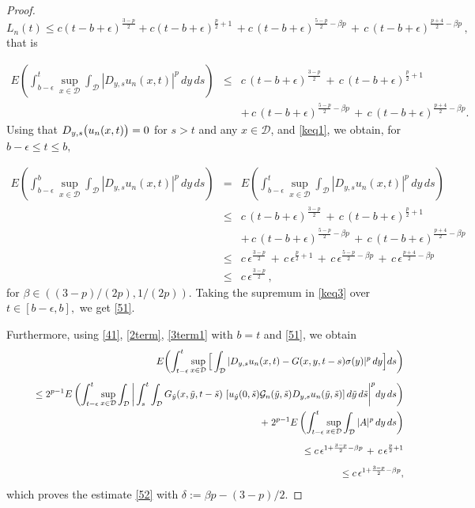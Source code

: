 \documentclass[10pt,a4paper]{amsart}
\newcommand{\cd}{\mathcal{D}}
\newcommand{\cg}{\mathcal{G}}
\begin{document}
\begin{proof}
$$L_n(t) \leq c (t-b+\epsilon)^{\frac{3-p}{2}} + c (t-b+\epsilon)^{\frac{p}{2}+1}\,+ c\, (t-b+\epsilon)^{\frac{5-p}{2}-\beta p}
\,+\,
c \, (t-b+\epsilon)^{\frac{p+4}{2}-\beta p} \,,$$
that is

\begin{eqnarray}\label{keq1}
E\left(\int_{b-\epsilon}^t \sup\limits_{x\in\mathcal{D}} \int_{\mathcal{D}}|D_{y,s}u_{n}(x,t)|^p\,dy\, ds\right)
&\leq& c \,(t-b+\epsilon)^{\frac{3-p}{2}} \,+\, c\, (t-b+\epsilon)^{\frac{p}{2}+1}
\nonumber\\
& & + \,c \,(t-b+\epsilon)^{\frac{5-p}{2}-\beta p}\,+\,
c \, (t-b+\epsilon)^{\frac{p+4}{2}-\beta p}.
\end{eqnarray}
Using that $ D_{y,s}\bigl{(}u_n(x,t)\bigr{)}=0 $ for $s>t$ and any $x\in\cd$, and \eqref{keq1}, we obtain, for $ b-\epsilon\leq t\leq b,$

\begin{eqnarray}\label{keq2}
E\left(\int_{b-\epsilon}^b \sup\limits_{x\in\mathcal{D}} \int_{\mathcal{D}}|D_{y,s}u_{n}(x,t)|^p\,dy\,ds\right)
&=&
E\left(\int_{b-\epsilon}^t \sup\limits_{x\in\mathcal{D}} \int_{\mathcal{D}}|D_{y,s}u_{n}(x,t)|^p\,dy\,ds\right)
\nonumber\\
&\leq&
 c \,(t-b+\epsilon)^{\frac{3-p}{2}} \,+\, c\, (t-b+\epsilon)^{\frac{p}{2}+1}
\nonumber\\
& &+\, c\, (t-b+\epsilon)^{\frac{5-p}{2}-\beta p}
\,+\,c \, (t-b+\epsilon)^{\frac{p+4}{2}-\beta p}
\nonumber\\
&\leq&
 c \,\epsilon^{\frac{3-p}{2}} \,+\, c\, \epsilon^{\frac{p}{2}+1}
\,+\, c\, \epsilon^{\frac{5-p}{2}-\beta p}
\,+\,c \, \epsilon^{\frac{p+4}{2}-\beta p}\nonumber\\
&\leq&
 c \,\epsilon^{\frac{3-p}{2}} \,,\label{keq3}
\end{eqnarray}
for $ \beta \in ((3-p)/(2p),1/(2p)). $ Taking the supremum in \eqref{keq3} over $t\in[b-\epsilon,b], $ we get \eqref{51}. 

Furthermore, using \eqref{41}, \eqref{2term}, \eqref{3term1}  with $b=t$ and \eqref{51}, we obtain
\begin{eqnarray*}\label{keq4}
& &E\biggl{(}\int_{t-\epsilon}^t \sup_{x\in\mathcal{D}}
\Big{[}\int_{\mathcal{D}}|D_{y,s}u_n(x,t)-G(x,y,t-s)\sigma(y)|^p\,dy\Big{]}
ds\biggr{)}
\\[0.5em]
& &\qquad\leq  2^{p-1}E\left(\int_{t-\epsilon}^t \sup\limits_{x\in\mathcal{D}} \int_{\mathcal{D}}
\bigg{|}\int_s^t\int_{\cd}G_{\Tilde{y}}(x,\Tilde{y},t-\Tilde{s})\
[u_{\Tilde{y}}(0,\Tilde{s})\cg_{n}(\Tilde{y},\Tilde{s})D_{y,s}u_n(\Tilde{y},\Tilde{s})]\,d\Tilde{y}\,d\Tilde{s}\bigg{|}^p dy\,ds\right)
\\
& &\qquad\qquad+\;2^{p-1} E\left(\int_{t-\epsilon}^t \sup_{x\in\mathcal{D}}\int_{\mathcal{D}}|A|^p\,dy\,ds\right)
\\[0.5em]
& &\qquad \leq 
c\,\epsilon^{1+\frac{3-p}{2}-\beta p} \,+\, c\,\epsilon^{\frac{p}{2}+1}
\\[0.5em]
& &\qquad\leq  c\,\epsilon^{1+\frac{3-p}{2}-\beta p} ,
\end{eqnarray*}
which proves the estimate \eqref{52} with $\delta:=\beta p-(3-p)/2.$
\end{proof}
\end{document}
